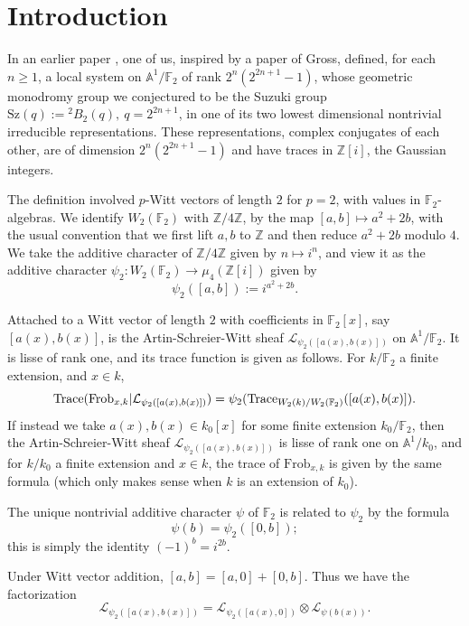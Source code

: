 \documentclass[11pt]{amsart}
\theoremstyle{plain}
\theoremstyle{definition}
\numberwithin{thm}{section}
\numberwithin{equation}{thm}
\newcommand{\Trace}{{\rm Trace}}
\newcommand{\Sz}{\mathrm{Sz}}
\newcommand{\sL}{{\mathcal L}}
\newcommand{\A}{{\mathbb A}}
\newcommand{\F}{{\mathbb F}}
\newcommand{\Z}{{\mathbb Z}}
\newcommand{\0}{\emptyset}
\newcommand{\tw}[1]{{}^#1\!}
\newcommand{\Frob}{\mathrm{Frob}}
\begin{document}

\section*{Introduction}
In an earlier paper \cite{Ka-ERS}, one of us, inspired by a paper \cite{Gross} of Gross, defined, for each $n \ge 1$, a local system on $\A^1/\F_2$ of rank  $2^n(2^{2n+1}-1)$, whose geometric monodromy group we conjectured to be the Suzuki group $\Sz(q):=\tw2B_2(q),\ q=2^{2n+1}$, in one of its two lowest dimensional nontrivial irreducible representations. These representations, complex conjugates of each other, are of dimension $2^n(2^{2n+1}-1)$ and have traces in $\Z[i]$, the Gaussian integers.

The definition involved $p$-Witt vectors  of length $2$ for $p=2$, with values in $\F_2$-algebras. We identify $W_2(\F_2)$ with $\Z/4\Z$, by the map
$[a,b] \mapsto a^2+2b$, with the usual convention that we first lift $a,b$ to $\Z$ and then reduce $a^2+2b$ modulo $4$. 
We take the additive
character of $\Z/4\Z$ given by $n \mapsto i^n$, and view it as the additive character $\psi_2:W_2(\F_2) \rightarrow \mu_4(\Z[i])$ given by
$$\psi_2([a,b]):= i^{a^2+2b}.$$

Attached to a Witt vector of length $2$ with coefficients in $\F_2[x]$, say $[a(x),b(x)]$, is the Artin-Schreier-Witt sheaf $\sL_{\psi_2([a(x),b(x)])} $ on $\A^1/\F_2$. It is lisse of rank one, and its trace function is given as follows. For $k/\F_2$ a finite extension, and $x \in k$,
$$\Trace(\Frob_{x,k}|\sL_{\psi_2([a(x),b(x)])})=\psi_2(\Trace_{W_2(k)/W_2(\F_2)}([a(x),b(x)]).$$
If instead we take $a(x), b(x) \in k_0[x]$ for some finite extension $k_0/\F_2$, then the Artin-Schreier-Witt sheaf $\sL_{\psi_2([a(x),b(x)])} $ is lisse of rank one on $\A^1/k_0$, and for $k/k_0$ a finite extension and $x \in k$, the trace of $\Frob_{x,k}$ is given by the same formula (which only makes sense when $k$ is an extension of $k_0$).


The unique nontrivial additive character $\psi$ of $\F_2$ is related to $\psi_2$ by the formula 
$$\psi(b)=\psi_2([0,b]);$$
this is simply the identity $(-1)^b = i^{2b}$.

Under Witt vector addition, $[a,b]=[a,0]+[0,b]$. Thus we have the factorization
$$\sL_{\psi_2([a(x),b(x)])} = \sL_{\psi_2([a(x),0])} \otimes \sL_{\psi(b(x))}.$$
\end{document}
